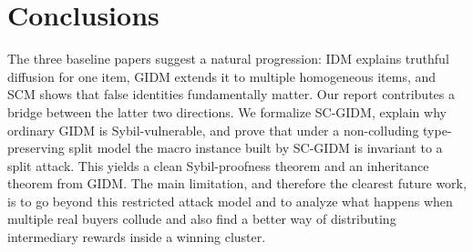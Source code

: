 \documentclass[sigconf]{aamas}
\theoremstyle{definition}
\theoremstyle{remark}
\begin{document}
\section{Conclusions}
The three baseline papers suggest a natural progression: IDM explains truthful diffusion for one item, GIDM extends it to multiple homogeneous items, and SCM shows that false identities fundamentally matter. Our report contributes a bridge between the latter two directions. We formalize SC-GIDM, explain why ordinary GIDM is Sybil-vulnerable, and prove that under a non-colluding type-preserving split model the macro instance built by SC-GIDM is invariant to a split attack. This yields a clean Sybil-proofness theorem and an inheritance theorem from GIDM. The main limitation, and therefore the clearest future work, is to go beyond this restricted attack model and to analyze what happens when multiple real buyers collude and also find a better way of distributing intermediary rewards inside a winning cluster.

\appendix
\end{document}
